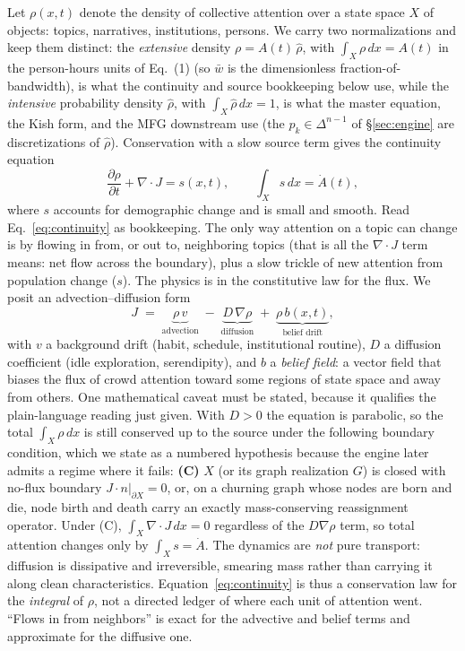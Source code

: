 \documentclass[11pt]{article}
\begin{document}
Let $\rho(x,t)$ denote the density of collective attention over a state space $X$ of objects: topics, narratives, institutions, persons. We carry two normalizations and keep them distinct: the \emph{extensive} density $\rho = A(t)\,\hat\rho$, with $\int_X\rho\,dx = A(t)$ in the person-hours units of Eq.~(1) (so $\bar w$ is the dimensionless fraction-of-bandwidth), is what the continuity and source bookkeeping below use, while the \emph{intensive} probability density $\hat\rho$, with $\int_X\hat\rho\,dx = 1$, is what the master equation, the Kish form, and the MFG downstream use (the $p_k\in\Delta^{n-1}$ of \S\ref{sec:engine} are discretizations of $\hat\rho$). Conservation with a slow source term gives the continuity equation
\begin{equation}
\frac{\partial \rho}{\partial t} + \nabla \cdot J = s(x,t),
\qquad \int_X s \,dx = \dot A(t),
\label{eq:continuity}
\end{equation}
where $s$ accounts for demographic change and is small and smooth. Read Eq.~\eqref{eq:continuity} as bookkeeping. The only way attention on a topic can change is by flowing in from, or out to, neighboring topics (that is all the $\nabla \cdot J$ term means: net flow across the boundary), plus a slow trickle of new attention from population change ($s$). The physics is in the constitutive law for the flux. We posit an advection--diffusion form
\begin{equation}
J \;=\; \underbrace{\rho\, v}_{\text{advection}} \;-\; \underbrace{D\,\nabla\rho}_{\text{diffusion}} \;+\; \underbrace{\rho\, b(x,t)}_{\text{belief drift}},
\label{eq:flux}
\end{equation}
with $v$ a background drift (habit, schedule, institutional routine), $D$ a diffusion coefficient (idle exploration, serendipity), and $b$ a \emph{belief field}: a vector field that biases the flux of crowd attention toward some regions of state space and away from others. One mathematical caveat must be stated, because it qualifies the plain-language reading just given. With $D>0$ the equation is parabolic, so the total $\int_X \rho\,dx$ is still conserved up to the source under the following boundary condition, which we state as a numbered hypothesis because the engine later admits a regime where it fails: \textbf{(C)} $X$ (or its graph realization $G$) is closed with no-flux boundary $J\cdot n|_{\partial X}=0$, or, on a churning graph whose nodes are born and die, node birth and death carry an exactly mass-conserving reassignment operator. Under (C), $\int_X \nabla\cdot J\,dx = 0$ regardless of the $D\nabla\rho$ term, so total attention changes only by $\int_X s = \dot A$. The dynamics are \emph{not} pure transport: diffusion is dissipative and irreversible, smearing mass rather than carrying it along clean characteristics. Equation~\eqref{eq:continuity} is thus a conservation law for the \emph{integral} of $\rho$, not a directed ledger of where each unit of attention went. ``Flows in from neighbors'' is exact for the advective and belief terms and approximate for the diffusive one.
\end{document}
